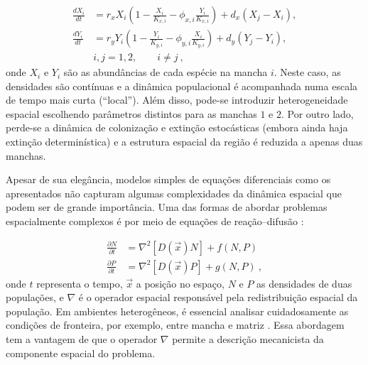 \documentclass[12pt]{extarticle}
\begin{document}
\begin{equation}
    \begin{aligned}
        \frac{dX_i}{dt} &= r_x X_i \left( 1 - \frac{X_i}{K_{x,i}} - \phi_{x,i}
        \frac{Y_i}{K_{x,i}} \right) + d_x (X_j - X_i), \\
        \frac{dY_i}{dt} &= r_y Y_i \left( 1 - \frac{Y_i}{K_{y,i}} - \phi_{y,i}
        \frac{X_i}{K_{y,i}} \right) + d_y (Y_j - Y_i), \\
        & i, j = 1, 2, \qquad i \neq j~,
    \end{aligned}
\end{equation}
%
onde $X_i$ e $Y_i$ são as abundâncias de cada espécie na mancha $i$. Neste
caso, as densidades são contínuas e a dinâmica populacional é acompanhada numa
escala de tempo mais curta (``local''). Além disso, pode-se introduzir
heterogeneidade espacial escolhendo parâmetros distintos para as manchas $1$ e
$2$. Por outro lado, perde-se a dinâmica de colonização e extinção
estocásticas (embora ainda haja extinção determinística) e a estrutura
espacial da região é reduzida a apenas duas manchas.

Apesar de sua elegância, modelos simples de equações diferenciais como os
apresentados não capturam algumas complexidades da dinâmica espacial que podem
ser de grande importância. Uma das formas de abordar problemas espacialmente
complexos é por meio de equações de reação--difusão \citep{murray2002}:

\begin{equation}
  \begin{aligned}
    \frac{\partial N}{\partial t} &= \nabla^2 \left[ D(\vec{x})N \right] + f(N,P)\\
    \frac{\partial P}{\partial t} &= \nabla^2 \left[ D(\vec{x})P \right] + g(N,P)~,
  \end{aligned}
\end{equation}
%
onde $t$ representa o tempo, $\vec{x}$ a posição no espaço, $N$ e $P$ as
densidades de duas populações, e $\nabla$ é o operador espacial responsável
pela redistribuição espacial da população. Em ambientes heterogêneos, é
essencial analisar cuidadosamente as condições de fronteira, por exemplo,
entre mancha e matriz \citep{turchin1998, ovaskainen2003}. Essa abordagem tem
a vantagem de que o operador $\nabla$ permite a descrição mecanicista da componente
espacial do problema.
\end{document}

